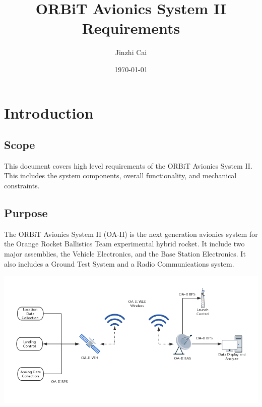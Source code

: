 \documentclass[12pt,article]{memoir}
\title{ORBiT Avionics System II Requirements}
\author{Jinzhi Cai}
\date{\today}
\begin{document}
	


\tableofcontents*
\clearpage


\chapter{Introduction}
\section{Scope}
This document covers high level requirements of the ORBiT Avionics System II. This includes the system components, overall functionality, and mechanical constraints.

\section{Purpose}
The ORBiT Avionics System II (OA-II) is the next generation avionics system for the Orange Rocket Ballistics Team experimental hybrid rocket. It include two major assemblies, the Vehicle Electronics, and the Base Station Electronics. It also includes a Ground Test System and a Radio Communications system.\par
\includegraphics[width=\textwidth]{ER00002_sys_diag.png}
\end{document}
